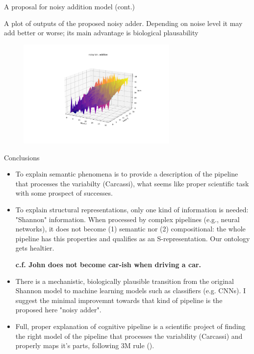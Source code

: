 \documentclass[10pt, aspectratio=169]{beamer}
\begin{document}
    

\begin{frame}{A proposal for noisy addition model (cont.)}
   
    A plot of outputs of the proposed noisy adder. Depending on noise level it may add better or worse; its main advantage is biological plausability
        
        \begin{figure}[h!]
            \centering
            \includegraphics[width=0.7\textwidth]{images/anoisy_adding.png}
            \caption{}
            \label{fig:noisy_adder}
        \end{figure}
    
    
    
    \end{frame}
    


    
    \begin{frame}{Conclusions }
    
        \begin{itemize}
           \item To explain semantic phenomena is to provide a description of the pipeline that processes the variabilty (Carcassi),  what seems like proper scientific task with some prospect of successes.
          
            \item To explain  structural representations, only one kind of information is needed: "Shannon" information. When processed by complex pipelines (e.g., neural networks), it does not become  (1) semantic nor (2) compositional: the whole pipeline has this properties  and qualifies as an S-representation. Our ontology gets healtier. 
            
        \textbf{    c.f. John does not become car-ish when driving a car.}

            \item There is a mechanistic, biologically plausible transition from the original Shannon model to machine learning models such as classifiers (e.g. CNNs). I suggest the minimal improvemnt towards that kind of pipeline is the proposed here "noisy adder".
            
            \item Full, proper explanation of cognitive pipeline is a scientific project of finding the right model of the pipeline that processes the variability (Carcassi) and properly maps it's parts, following 3M rule (\cite{Craver}).
        \end{itemize}
      
    \end{frame}
    
\end{document}
